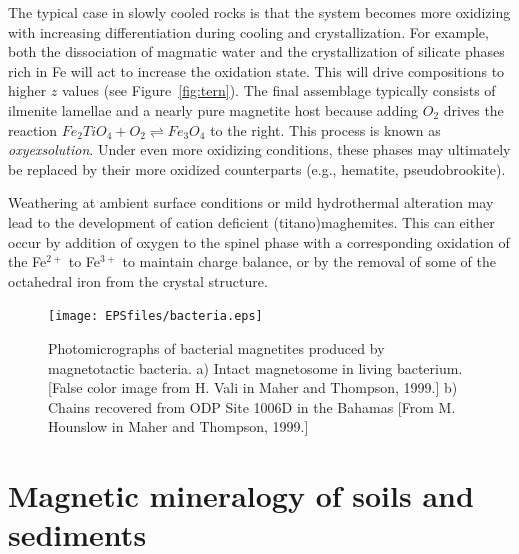 The typical case in slowly cooled rocks is that the system becomes more oxidizing with increasing differentiation during cooling and crystallization.  For example, both the dissociation of magmatic water and the crystallization of silicate phases rich in Fe will act to increase the oxidation state.  This will drive compositions to higher $z$ values (see Figure~\ref{fig:tern}).  The final assemblage typically consists of ilmenite lamellae and a nearly pure magnetite host because adding $O_2$ drives the reaction 
$
Fe_2TiO_4 + O_2 \rightleftharpoons Fe_3O_4$
to the right.  This process is known as {\it oxyexsolution}.  Under even more oxidizing conditions, these phases may ultimately be replaced by their more oxidized counterparts (e.g., hematite, pseudobrookite).  

Weathering at ambient surface conditions or mild hydrothermal alteration may lead to the development of cation deficient (titano)maghemites.  This can either occur by addition of oxygen to the spinel phase with a corresponding oxidation of the Fe$^{2+}$ to Fe$^{3+}$ to maintain charge balance, or by the removal of some of the octahedral iron from the crystal structure.  


\begin{figure}[htb]
\texttt{[image: EPSfiles/bacteria.eps]}
\caption{Photomicrographs of bacterial magnetites produced by magnetotactic bacteria.  a) Intact magnetosome in living bacterium. [False color image from H. Vali in Maher and Thompson, 1999.]  b) Chains recovered from ODP Site 1006D in the Bahamas [From M. Hounslow in Maher and Thompson, 1999.]}
\label{fig:bacteria}
\end{figure}
\nocite{maher99}



\section{Magnetic mineralogy of soils and sediments}


